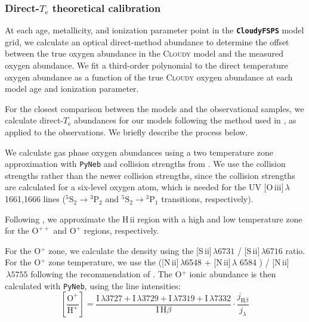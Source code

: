 \documentclass[preprint2]{aastex62}
\newcommand{\CloudyFSPS}{{\tt \textbf{CloudyFSPS}}\xspace}
\newcommand{\Cloudy}{\textsc{Cloudy}\xspace}
\newcommand{\hii}{H\,{\sc ii}\xspace}
\newcommand{\nii}{[N\,{\sc ii}]\xspace}
\newcommand{\sii}{[S\,{\sc ii}]\xspace}
\newcommand{\oiii}{[O\,{\sc iii}]\xspace}
\newcommand{\Te}{\ensuremath{T_{\mathrm{e}}}\xspace}
\begin{document}
\subsubsection{Direct-\Te theoretical calibration}\label{sec:Z:corr:Te}

At each age, metallicity, and ionization parameter point in the \CloudyFSPS model grid, we calculate an optical direct-method abundance to determine the offset between the true oxygen abundance in the \Cloudy model and the measured oxygen abundance. We fit a third-order polynomial to the direct temperature oxygen abundance as a function of the true \Cloudy oxygen abundance at each model age and ionization parameter.

For the closest comparison between the models and the observational samples, we calculate direct-\Te abundances for our models following the method used in \citet{Berg+2015}, as applied to the \citet{Berg+2016} observations. We briefly describe the process below.

We calculate gas phase oxygen abundances using a two temperature zone approximation with {\tt PyNeb} \citep{PyNeb} and collision strengths from \citet{Aggarwal+1999}. We use the \citet{Aggarwal+1999} collision strengths rather than the newer \citet{Storey+2014} collision strengths, since the \citet{Aggarwal+1999} collision strengths are calculated for a six-level oxygen atom, which is needed for the UV \oiii$\,\lambda$1661,1666 lines (${}^5\mathrm{S}_2 \rightarrow {}^3\mathrm{P}_2$ and ${}^5\mathrm{S}_2 \rightarrow {}^3\mathrm{P}_1$ transitions, respectively).

Following \citet{Garnett+1999, Berg+2015}, we approximate the \hii region with a high and low temperature zone for the $\mathrm{O}^{++}$ and $\mathrm{O}^{+}$ regions, respectively.

For the O$^{+}$ zone, we calculate the density using the \sii$\,\lambda 6731$ / \sii$\,\lambda 6716$ ratio. For the O$^{+}$ zone temperature, we use the (\nii$\,\lambda$6548 $+$ \nii$\,\lambda$ 6584 ) / \nii$\,\lambda 5755$ following the recommendation of \citet{Berg+2015}. The O$^{+}$ ionic abundance is then calculated with {\tt PyNeb}, using the line intensities:
\begin{equation}
    \left[ \frac{\mathrm{O}^{+}}{\mathrm{H}^{+}} \right] = \frac{\mathrm{I}\,\lambda 3727 + \mathrm{I}\,\lambda 3729 + \mathrm{I}\,\lambda 7319 + \mathrm{I}\,\lambda 7332}{\mathrm{I}\,\mathrm{H}\beta} \cdot \frac{j_{\mathrm{H}\beta}}{j_{\lambda}}
\end{equation}
\end{document}
